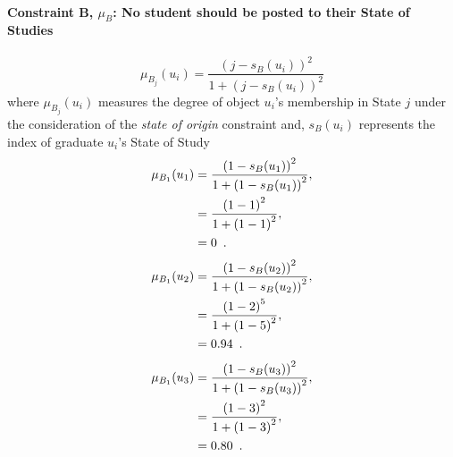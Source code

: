 \documentclass[a4paper,openany]{book}
\begin{document}
			\paragraph{Constraint B, $\mu_B$: No student should be posted to their State of Studies}
				\begin{equation}
					\mu_{B_j}(u_i) = \frac{\left(j-s_B(u_i)\right)^2}{1 + \left(j-s_B(u_i)\right)^2}
				\end{equation}
				where $\mu_{B_j}(u_i)$ measures the degree of object $u_i$'s membership in State $j$ under the consideration of the \textit{state of origin} constraint and,
				$s_B(u_i)$ represents the index of graduate $u_i$'s State of Study\\
				\begin{align}
					\mu_{B_1}(u_1) &= \frac{\left(1-s_B(u_1)\right)^2}{1 + \left(1-s_B(u_1)\right)^2} ,\\
					&= \frac{\left(1-1\right)^2}{1 + \left(1-1\right)^2} \notag ,\\
					&= 0 \enspace. \notag
				\end{align}
				\begin{align}
					\mu_{B_1}(u_2) &= \frac{\left(1-s_B(u_2)\right)^2}{1 + \left(1-s_B(u_2)\right)^2} ,\\
					&= \frac{\left(1-2\right)^5}{1 + \left(1-5\right)^2} \notag ,\\
					&= 0.94 \enspace. \notag
				\end{align}
				\begin{align}
					\mu_{B_1}(u_3) &= \frac{\left(1-s_B(u_3)\right)^2}{1 + \left(1-s_B(u_3)\right)^2} ,\\
					&= \frac{\left(1-3\right)^2}{1 + \left(1-3\right)^2} \notag ,\\
					&= 0.80 \enspace. \notag
				\end{align}
\end{document}
